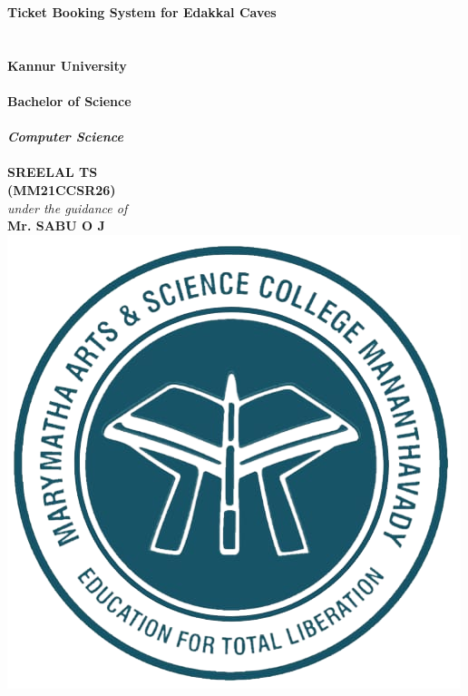 \documentclass[12pt,a4paper]{report}
\begin{document}


\thispagestyle{empty}

\begin{center}
    \fontsize{25pt}{18pt}\selectfont \textbf{
        Ticket Booking System for Edakkal Caves
    }\\[.5 cm]
    \fontsize{12pt}{18pt}\selectfont {}\\[.5 cm]
    \fontsize{12pt}{18pt}\selectfont {}\\[.7 cm]
    \fontsize{14pt}{18pt}\selectfont \textbf{Kannur
        University}\\[.2 cm]
    \fontsize{12pt}{18pt}\selectfont {}\\[.5 cm]
    \vspace{0.4cm}
    \fontsize{14pt}{18pt}\selectfont \textbf{Bachelor of Science}\\
    \fontsize{12pt}{18pt}\selectfont {}\\
    \fontsize{12pt}{18pt}\selectfont \textbf{\textit{Computer Science}}\\
    \fontsize{12pt}{18pt}\selectfont {}\\
    \vspace{0.4cm}
    \fontsize{17.28pt}{18pt}\selectfont \textbf{SREELAL TS}\\[.2 cm]
    \fontsize{14pt}{18pt}\selectfont \textbf{(MM21CCSR26)}\\[.5 cm]
    \fontsize{12pt}{18pt}\selectfont \textit{under the guidance of}\\[.4 cm]
    \fontsize{14pt}{18pt}\selectfont \textbf{Mr. SABU O J}\\
    \vspace{.7cm}
    \includegraphics[scale=0.25]{assets/mmc.png}\\[.2 cm]

\end{center}
\end{document}
